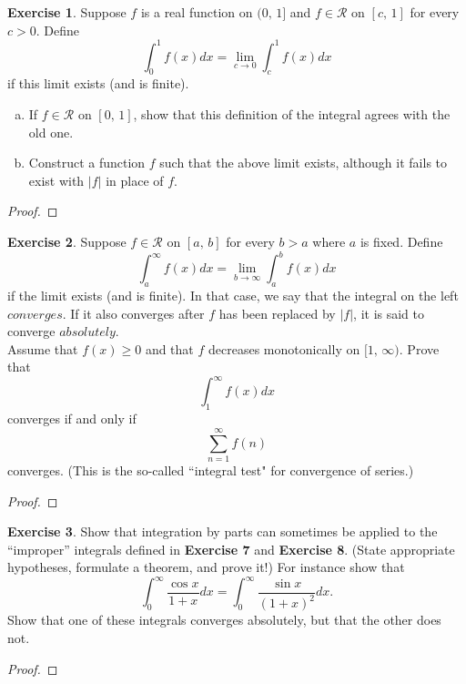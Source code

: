 \documentclass[12pt]{book}
\theoremstyle{definition}
\newtheorem{exe}{Exercise}
\begin{document}
	\newpage
	\begin{exe}
		Suppose $f$ is a real function on $(0,\,1]$ and $f\in\mathscr{R}$ on $[c,\,1]$ for every $c>0$. Define 
		\begin{equation*}
			\int_{0}^1 f(x) dx=\lim_{c\rightarrow 0} \int_{c}^{1} f(x) dx
		\end{equation*}
		if this limit exists (and is finite).
		\begin{enumerate}[(a)]
			\item If $f\in\mathscr{R}$ on $[0,\,1]$, show that this definition of the integral agrees with the old one.
			\item Construct a function $f$ such that the above limit exists, although it fails to exist with $|f|$ in place of $f$.
		\end{enumerate}
	\end{exe}
	\begin{proof}
	\end{proof}
	\newpage
	\begin{exe}
		Suppose $f\in\mathscr{R}$ on $[a,\,b]$ for every $b>a$ where $a$ is fixed. Define
		\begin{equation*}
			\int_{a}^\infty f(x) dx=\lim_{b\rightarrow \infty} \int_{a}^b f(x) dx
		\end{equation*}
		if the limit exists (and is finite). In that case, we say that the integral on the left $converges$. If it also converges after $f$ has been replaced by $|f|$, it is said to converge $absolutely$.\\
		Assume that $f(x)\geq0$ and that $f$ decreases monotonically on $[1,\,\infty)$. Prove that $$\int_{1}^\infty f(x) dx$$ converges if and only if $$\displaystyle\sum_{n=1}^\infty f(n)$$ converges. (This is the so-called ``integral test" for convergence of series.)
	\end{exe}
	\begin{proof}
	\end{proof}
	\newpage
	\begin{exe}
		Show that integration by parts can sometimes be applied to the ``improper'' integrals defined in \textbf{Exercise 7} and \textbf{Exercise 8}. (State appropriate hypotheses, formulate a theorem, and prove it!) For instance show that $$\int_0^\infty \dfrac{\cos x}{1+x}dx=\int_0^\infty \dfrac{\sin x}{(1+x)^2}dx.$$
		Show that one of these integrals converges absolutely, but that the other does not.
	\end{exe}
	\begin{proof}
	\end{proof}
\end{document}
